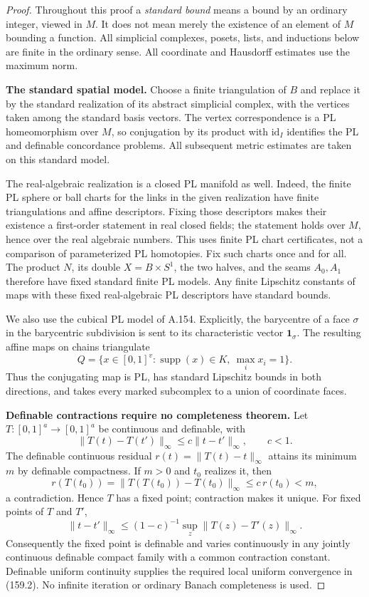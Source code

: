 \begin{proof}
Throughout this proof a \emph{standard bound} means a bound by
an ordinary integer, viewed in $M$. It does not mean merely
the existence of an element of $M$ bounding a function.
All simplicial complexes, posets, lists, and inductions below
are finite in the ordinary sense.
All coordinate and Hausdorff estimates use the maximum norm.

\textbf{The standard spatial model.}\quad
Choose a finite triangulation of $B$ and replace it by the
standard realization of its abstract simplicial complex,
with the vertices taken among the standard basis vectors.
The vertex correspondence is a PL homeomorphism over $M$,
so conjugation by its product with $\mathrm{id}_I$ identifies
the PL and definable concordance problems. All subsequent
metric estimates are taken on this standard model.

The real-algebraic realization is a closed PL manifold as well.
Indeed, the finite PL sphere or ball charts for the links in
the given realization have finite triangulations and affine
descriptors. Fixing those descriptors makes their existence
a first-order statement in real closed fields; the statement
holds over $M$, hence over the real algebraic numbers. This
uses finite PL chart certificates, not a comparison of
parameterized PL homotopies. Fix such charts once and for all.
The product $N$, its double $X=B\times S^1$, the two halves,
and the seams $A_0,A_1$ therefore have fixed standard finite
PL models. Any finite Lipschitz constants of maps with these
fixed real-algebraic PL descriptors have standard bounds.

We also use the cubical PL model of A.154. Explicitly, the
barycentre of a face $\sigma$ in the barycentric subdivision
is sent to its characteristic vector $\mathbf1_\sigma$.
The resulting affine maps on chains triangulate
\[
 Q=\{x\in[0,1]^v:
          \operatorname{supp}(x)\in K,\ \max_i x_i=1\}.
\]
Thus the conjugating map is PL, has standard Lipschitz bounds
in both directions, and takes every marked subcomplex to a
union of coordinate faces.

\textbf{Definable contractions require no completeness theorem.}\quad
Let $T:[0,1]^a\to[0,1]^a$ be continuous and definable, with
\[
 \|T(t)-T(t')\|_\infty\le c\|t-t'\|_\infty,\qquad c<1.
\]
The definable continuous residual
$r(t)=\|T(t)-t\|_\infty$ attains its minimum $m$ by definable
compactness. If $m>0$ and $t_0$ realizes it, then
\[
 r(T(t_0))
 =\|T(T(t_0))-T(t_0)\|_\infty
 \le c\,r(t_0)<m,
\]
a contradiction. Hence $T$ has a fixed point; contraction
makes it unique. For fixed points of $T$ and $T'$,
\[
 \|t-t'\|_\infty
 \le (1-c)^{-1}\sup_z\|T(z)-T'(z)\|_\infty.
 \tag{159.2}
\]
Consequently the fixed point is definable and varies
continuously in any jointly continuous definable compact
family with a common contraction constant. Definable uniform
continuity supplies the required local uniform convergence
in (159.2). No infinite iteration or ordinary Banach
completeness is used.


\end{proof}
